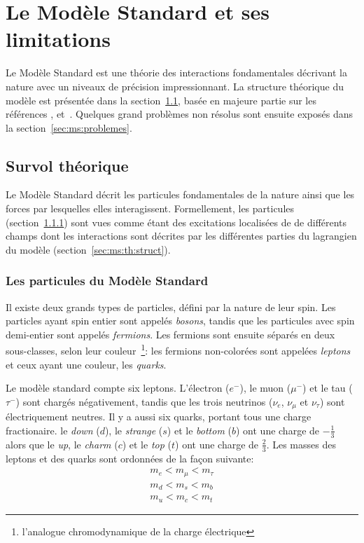 \chapter{Le Modèle Standard et ses limitations}
\label{sec:ms}

Le Modèle Standard est une théorie des interactions fondamentales
décrivant la nature avec un niveaux de précision impressionnant.  La
structure théorique du modèle est présentée dans la
section~\ref{sec:ms:th}, basée en majeure partie sur les références
\cite{olive_ewk_2014}, \cite{olive_qcd_2014}
et~\cite{thomson_modern_2013}. Quelques grand problèmes non résolus
sont ensuite exposés dans la section~\ref{sec:ms:problemes}.

\section{Survol théorique}
\label{sec:ms:th}

Le Modèle Standard décrit les particules fondamentales de la nature
ainsi que les forces par lesquelles elles interagissent. Formellement,
les particules (section~\ref{sec:ms:th:particules}) sont vues comme
étant des excitations localisées de de différents champs dont les
interactions sont décrites par les différentes parties du lagrangien
du modèle (section~\ref{sec:ms:th:struct}).

\subsection{Les particules du Modèle Standard}
\label{sec:ms:th:particules}

Il existe deux grands types de particles, défini par la nature
de leur spin. Les particles ayant spin entier sont appelés
\emph{bosons}, tandis que les particules avec spin demi-entier sont
appelés \emph{fermions}. Les fermions sont ensuite séparés en deux
sous-classes, selon leur couleur~\footnote{l'analogue chromodynamique
  de la charge électrique}: les fermions non-colorées sont appelées
\emph{leptons} et ceux ayant une couleur, les \emph{quarks}. 

Le modèle standard compte six leptons. L'électron ($e^-$), le muon
($\mu^-$) et le tau ($\tau^-$) sont chargés négativement, tandis que
les trois neutrinos ($\nu_e$, $\nu_\mu$ et $\nu_\tau$) sont
électriquement neutres. Il y a aussi six quarks, portant tous une
charge fractionaire. le \emph{down} ($d$), le \emph{strange} ($s$) et
le \emph{bottom} ($b$) ont une charge de $-\frac{1}{3}$ alors que le
\emph{up}, le \emph{charm} ($c$) et le \emph{top} ($t$) ont une charge
de $\frac{2}{3}$. Les masses des
leptons et des quarks sont ordonnées de la façon suivante:
\begin{eqnarray}
  m_e < m_\mu < m_\tau \nonumber \\
  m_d < m_s < m_b \\
  m_u < m_c < m_t \nonumber 
\end{eqnarray}

